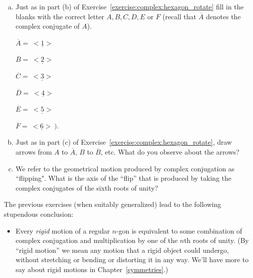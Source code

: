 \begin{exercise}{55}
\begin{enumerate}[(a)]
\item
Just as in part (b) of Exercise~\ref{exercise:complex:hexagon_rotate} fill in the blanks with the correct letter $A,B,C,D,E$ or $F$ (recall that $\overline{A}$ denotes the complex conjugate of $A$).
\begin{multicols}{3}
$ \overline{A} = \underline{~<1>~} $

$  \overline{B} = \underline{~<2>~}$

$  \overline{C} = \underline{~<3>~}$

 $ \overline{D} = \underline{~<4>~}$

$ \overline{E} = \underline{~<5>~}$

 $ \overline{F} = \underline{~<6>~}).  $
\end{multicols}
\item 
Just as in part (c) of Exercise~\ref{exercise:complex:hexagon_rotate}, draw arrows from $A$ to $\overline{A}$, $B$ to $\overline{B}$, etc. What do you observe about the arrows?

\item We refer to the geometrical motion produced by complex conjugation as ``flipping". What is the axis of the ``flip'' that is produced by taking the complex conjugates of the sixth roots of unity?
\end{enumerate}
\end{exercise}

The previous exercises (when suitably generalized) lead to the following stupendous conclusion:

\begin{itemize}
\item
Every \emph{rigid} motion of a regular $n$-gon is equivalent to some combination of complex conjugation and multiplication by one of the $n$th roots of unity. (By ``rigid motion'' we mean any motion that a rigid object could undergo, without stretching or bending or distorting it in any way. We'll have more to say about rigid motions in Chapter~\ref{symmetries}.) 
\end{itemize}

